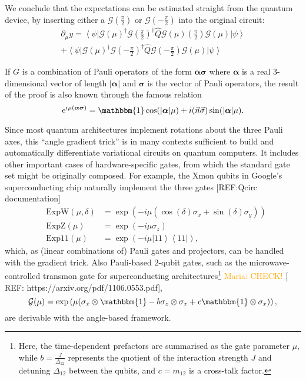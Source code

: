 \documentclass[aps,pra,10pt,twocolumn,groupedaddress,nofootinbib]{revtex4-1}
\theoremstyle{plain}
\newcommand{\ket}[1]{\ensuremath{\left| #1 \right \rangle}}
\newcommand{\bra}[1]{\ensuremath{\left \langle #1 \right |}}
\newcommand{\ketbra}[2]{\ket{#1}\bra{#2}}
\newcommand{\e}{\mathrm{e}}
\newcommand{\G}{\mathcal{G}}
\newcommand{\maria}[1]{\textcolor{orange}{Maria: #1}}
\begin{document}
We conclude that the expectations can be estimated straight from the quantum device, by inserting either a $\G(\frac{\pi}{2})$ or $\G(-\frac{\pi}{2})$ into the original circuit:
\begin{multline*}
	\partial_{\mu} y =   \bra{\psi} \G\left(\mu \right)^{\dagger} \G \left(\frac{\pi}{2} \right)^{\dagger}  \hat{Q} \G\left(\mu \right) \left(\frac{\pi}{2} \right) \G\left(\mu \right) \ket{\psi} \\ + \bra{\psi} \G\left(\mu \right)^{\dagger} \G \left(- \frac{\pi}{2} \right)^{\dagger} \hat{Q} \G \left(-\frac{\pi}{2} \right) \G\left(\mu \right) \ket{\psi}
\end{multline*}

If $G$ is a combination of Pauli operators of the form $\boldsymbol\alpha \boldsymbol\sigma$ where $\boldsymbol\alpha$ is a real $3$-dimensional vector of length $|\boldsymbol\alpha|$ and $\boldsymbol\sigma$ is the vector of Pauli operators, the result of the proof is also known through the famous relation
\[\e^{i \mu (\boldsymbol\alpha \boldsymbol\sigma)} = \mathbbm{1} \cos(|\boldsymbol\alpha| \mu) + i (\vec{n} \vec{\sigma}) \sin(|\boldsymbol\alpha| \mu).\] 


Since most quantum architectures implement rotations about the three Pauli axes, this ``angle gradient trick'' is in many contexts sufficient to build and automatically differentiate variational circuits on quantum computers. It includes other important cases of hardware-specific gates, from which the standard gate set might be originally composed. For example, the Xmon qubits in Google's superconducting chip naturally implement the three gates [REF:Qcirc documentation]
\begin{eqnarray*} 
&\text{ExpW}(\mu, \delta) &= \exp \left(- i \mu \left( \cos (\delta) \sigma_x + \sin(\delta)\sigma_y\right) \right)\\
&\text{ExpZ}(\mu) &= \exp \left(- i \mu \sigma_z \right)\\
&\text{Exp11}(\mu) &= \exp \left(- i \mu \ketbra{11}{11} \right), 
\end{eqnarray*}
which, as (linear combinations of) Pauli gates and projectors, can be handled with the gradient trick. Also Pauli-based $2$-qubit gates, such as the microwave-controlled transmon gate for superconducting architectures\footnote{Here, the time-dependent prefactors are summarised as the gate parameter $\mu$, while $b=\frac{J}{\Delta_{12}}$ represents the quotient of the interaction strength $J$ and detuning $\Delta_{12}$ between the qubits, and $c =m_{12}$ is a cross-talk factor.} \maria{CHECK!} [ REF: https://arxiv.org/pdf/1106.0553.pdf],
\begin{equation*}
\G(\mu) = \exp \left( \mu (\sigma_x \otimes \mathbbm{1} -  b \sigma_z \otimes \sigma_x + c \mathbbm{1} \otimes \sigma_x)  \right),
\end{equation*}
are derivable with the angle-based framework.  
\end{document}
